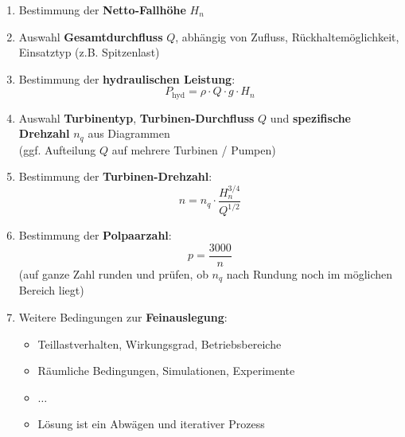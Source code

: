 \begin{enumerate}
    \item Bestimmung der \textbf{Netto-Fallhöhe} \( H_n \)
    \item Auswahl \textbf{Gesamtdurchfluss} \( Q \), abhängig von Zufluss, Rückhaltemöglichkeit, Einsatztyp (z.B. Spitzenlast)
    \item Bestimmung der \textbf{hydraulischen Leistung}:
    \[
    P_\mathrm{hyd} = \rho \cdot Q \cdot g \cdot H_n
    \]
    \item Auswahl \textbf{Turbinentyp}, \textbf{Turbinen-Durchfluss} \( Q \) und \textbf{spezifische Drehzahl} \( n_q \) aus Diagrammen\\
    (ggf. Aufteilung \( Q \) auf mehrere Turbinen / Pumpen)
    \item Bestimmung der \textbf{Turbinen-Drehzahl}:
    \[
    n = n_q \cdot \frac{H_n^{3/4}}{Q^{1/2}}
    \]
    \item Bestimmung der \textbf{Polpaarzahl}:
    \[
    p = \frac{3000}{n}
    \]
    (auf ganze Zahl runden und prüfen, ob \( n_q \) nach Rundung noch im möglichen Bereich liegt)
    \item Weitere Bedingungen zur \textbf{Feinauslegung}:
    \begin{itemize}
        \item Teillastverhalten, Wirkungsgrad, Betriebsbereiche
        \item Räumliche Bedingungen, Simulationen, Experimente
        \item \(\ldots\)
        \item Lösung ist ein Abwägen und iterativer Prozess
    \end{itemize}
\end{enumerate}


















